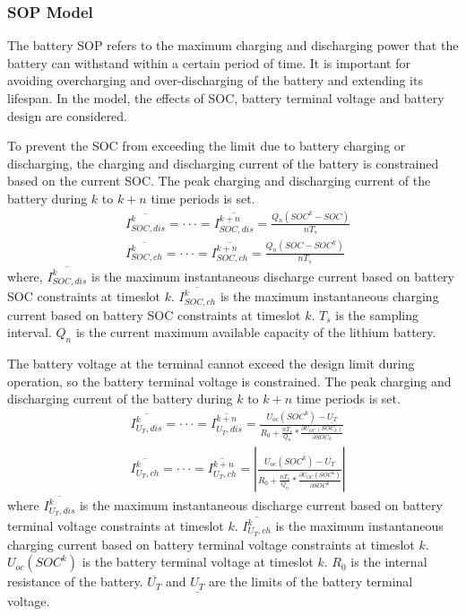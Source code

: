 \documentclass[journal,twoside]{IEEEtran}
\begin{document}
\subsubsection{SOP Model}
The battery SOP refers to the maximum charging and discharging power that the battery can withstand within a certain period of time. It is important for avoiding overcharging and over-discharging of the battery and extending its lifespan. In the model, the effects of SOC, battery terminal voltage and battery design are considered.

To prevent the SOC from exceeding the limit due to battery charging or discharging, the charging and discharging current of the battery is constrained based on the current SOC. The peak charging and discharging current of the battery during $k$ to $k+n$ time periods is set.
\begin{align}
&\overline{I^{k}_{SOC,dis}}=\cdot \cdot \cdot =\overline{I^{k+n}_{SOC,dis}}=\frac{Q_n(SOC^k-\underline{SOC})}{n{{T}_{s}}}\\
&\overline{I^{k}_{SOC,ch}}=\cdot \cdot \cdot =\overline{I^{k+n}_{SOC,ch}}=\frac{Q_n(\overline{SOC}-SOC^k)}{n{{T}_{s}}}
\end{align}
where, $\overline{I^{k}_{SOC,dis}}$ is the maximum instantaneous discharge current based on battery SOC constraints at timeslot $k$. $\overline{I^{k}_{SOC,ch}}$ is the maximum instantaneous charging current based on battery SOC constraints at timeslot $k$. ${{T}_{s}}$ is the sampling interval. ${{Q}_{n}}$ is the current maximum available capacity of the lithium battery.

The battery voltage at the terminal cannot exceed the design limit during operation, so the battery terminal voltage is constrained. The peak charging and discharging current of the battery during $k$ to $k+n$ time periods is set.
\begin{align}
&\overline{I^{k}_{{U_T},dis}}=\cdot \cdot \cdot =\overline{I^{k+n}_{{U_T},dis}}=\frac{{{U}_{oc}}(SOC^{k})-\underline{U_{T}}}{{{R}_{0}}+\frac{n{{T}_{s}}}{{{Q}_{n}}}* \frac{\partial {U_{OC}}(SOC_{k})}{\partial SOC_{k}}}\\
&\overline{I^{k}_{{U_T},ch}}=\cdot \cdot \cdot =\overline{I^{k+n}_{{U_T},ch}}=\left| \frac{{{U}_{oc}}(SOC^k)-\overline{U_T}}{R_0+\frac{n{T_s}}{Q_n}* \frac{\partial {U_{OC}}(SOC^k)}{\partial SOC^k}} \right|
\end{align}
where $\overline{I^{k}_{{U_T},dis}}$ is the maximum instantaneous discharge current based on battery terminal voltage constraints at timeslot $k$.
$\overline{I^{k}_{{U_T},ch}}$ is the maximum instantaneous charging current based on battery terminal voltage constraints at timeslot $k$.
${U_{oc}}(SOC^k)$ is the battery terminal voltage at timeslot $k$.
${R_0}$ is the internal resistance of the battery.
$\overline{U_T}$ and $\underline{U_T}$ are the limits of the battery terminal voltage.
\end{document}

